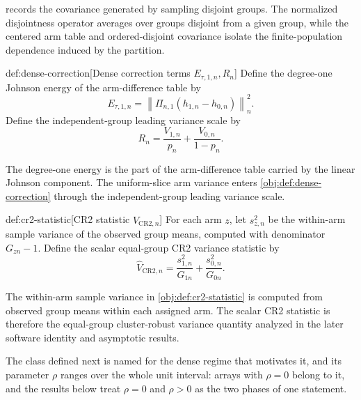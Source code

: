 \documentclass[11pt]{article}
\begin{document}
 records the covariance generated by sampling disjoint groups. The normalized disjointness operator  averages over groups disjoint from a given group, while the centered arm table  and ordered-disjoint covariance  isolate the finite-population dependence induced by the partition.

\begin{definitionv}{def:dense-correction}[Dense correction terms \(E_{\tau,1,n},R_n\)]
Define the degree-one Johnson energy of the arm-difference table by
\[
E_{\tau,1,n}
=
\left\|\Pi_{n,1}(h_{1,n}-h_{0,n})\right\|_n^2 .
\]
Define the independent-group leading variance scale by
\[
R_n
=
\frac{V_{1,n}}{p_n}
+
\frac{V_{0,n}}{1-p_n}.
\]
\end{definitionv}

The degree-one energy  is the part of the arm-difference table carried by the linear Johnson component. The uniform-slice arm variance  enters \cref{obj:def:dense-correction} through the independent-group leading variance scale.

\begin{definitionv}{def:cr2-statistic}[CR2 statistic \(\widehat V_{\mathrm{CR2},n}\)]
For each arm \(z\), let \(s_{z,n}^2\) be the within-arm sample variance of the observed group means, computed with denominator \(G_{zn}-1\). Define the scalar equal-group CR2 variance statistic by
\[
\widehat V_{\mathrm{CR2},n}
=
\frac{s_{1,n}^2}{G_{1n}}
+
\frac{s_{0,n}^2}{G_{0n}}.
\]
\end{definitionv}

The within-arm sample variance  in \cref{obj:def:cr2-statistic} is computed from observed group means within each assigned arm. The scalar CR2 statistic  is therefore the equal-group cluster-robust variance quantity analyzed in the later software identity and asymptotic results.

The class defined next is named for the dense regime that motivates it, and its parameter \(\rho\) ranges over the whole unit interval: arrays with \(\rho=0\) belong to it, and the results below treat \(\rho=0\) and \(\rho>0\) as the two phases of one statement.
\end{document}
